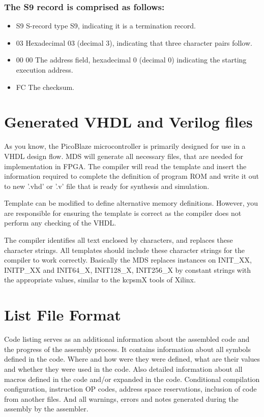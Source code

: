                 \subsubsection{The S9 record is comprised as follows:}
                    \begin{itemize}
                        \item S9 S-record type S9, indicating it is a termination record.
                        \item 03 Hexadecimal 03 (decimal 3), indicating that three character pairs follow.
                        \item 00 00 The address field, hexadecimal 0 (decimal 0) indicating the starting execution address.
                        \item FC The checksum.
                    \end{itemize}
        \section{Generated VHDL and Verilog files}
            As you know, the PicoBlaze microcontroller is primarily designed for use in a VHDL design flow.
            MDS will generate all necessary files, that are needed for implementation in FPGA.
            The compiler will read the template and insert the information required to complete
            the definition of program ROM and write it out to new '.vhd' or '.v' file that is ready for
            synthesis and simulation.

            Template can be modified to define alternative memory definitions. However, you are
            responsible for ensuring the template is correct as the compiler does not perform any
            checking of the VHDL.

            The compiler identifies all text enclosed by {} characters, and replaces these
            character strings. All templates should include these {} character strings for
            the compiler to work correctly. Basically the MDS replaces instances on
            {INIT\_XX}, {INITP\_XX} and {INIT64\_X}, {INIT128\_X}, {INIT256\_X} by constant strings with the appropriate values, similar to the kcpsmX tools of Xilinx.

        \section{List File Format}
                Code listing serves as an additional information about the assembled code and the progress of the assembly process.
                It contains information about all symbols defined in the code. Where and how were they were defined, what are their
                values and whether they were used in the code. Also detailed information about all macros defined in the code and/or
                expanded in the code. Conditional compilation configuration, instruction OP codes, address space reservations, inclusion
                of code from another files. And all warnings, errors and notes generated during the assembly by the assembler.

